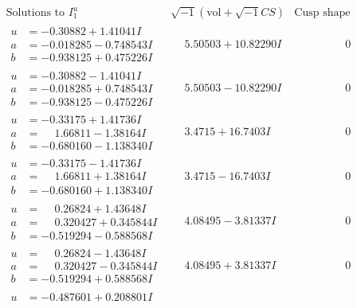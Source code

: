 \documentclass[1p]{elsarticle_modified}
\theoremstyle{definition}
\newcommand{\I}{\sqrt{-1}}
\begin{document}
$$\begin{array}{c|c|c}
\text{Solutions to }I^u_{1}& \I (\text{vol} + \sqrt{-1}CS) & \text{Cusp shape}\\
 \hline 
\begin{aligned}
u &= -0.30882 + 1.41041 I \\
a &= -0.018285 - 0.748543 I \\
b &= -0.938125 + 0.475226 I\end{aligned}
 & \phantom{-}5.50503 + 10.82290 I & \phantom{-0.000000 } 0 \\ \hline\begin{aligned}
u &= -0.30882 - 1.41041 I \\
a &= -0.018285 + 0.748543 I \\
b &= -0.938125 - 0.475226 I\end{aligned}
 & \phantom{-}5.50503 - 10.82290 I & \phantom{-0.000000 } 0 \\ \hline\begin{aligned}
u &= -0.33175 + 1.41736 I \\
a &= \phantom{-}1.66811 - 1.38164 I \\
b &= -0.680160 - 1.138340 I\end{aligned}
 & \phantom{-}3.4715 + 16.7403 I & \phantom{-0.000000 } 0 \\ \hline\begin{aligned}
u &= -0.33175 - 1.41736 I \\
a &= \phantom{-}1.66811 + 1.38164 I \\
b &= -0.680160 + 1.138340 I\end{aligned}
 & \phantom{-}3.4715 - 16.7403 I & \phantom{-0.000000 } 0 \\ \hline\begin{aligned}
u &= \phantom{-}0.26824 + 1.43648 I \\
a &= \phantom{-}0.320427 + 0.345844 I \\
b &= -0.519294 - 0.588568 I\end{aligned}
 & \phantom{-}4.08495 - 3.81337 I & \phantom{-0.000000 } 0 \\ \hline\begin{aligned}
u &= \phantom{-}0.26824 - 1.43648 I \\
a &= \phantom{-}0.320427 - 0.345844 I \\
b &= -0.519294 + 0.588568 I\end{aligned}
 & \phantom{-}4.08495 + 3.81337 I & \phantom{-0.000000 } 0 \\ \hline\begin{aligned}
u &= -0.487601 + 0.208801 I \\

\end{aligned}
\end{array}$$
\end{document}
